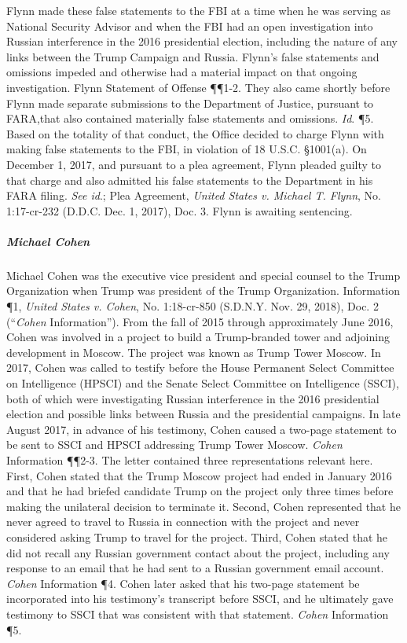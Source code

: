 Flynn made these false statements to the FBI at a time when he was serving as National Security Advisor and when the FBI had an open investigation into Russian interference in the 2016 presidential election, including the nature of any links between the Trump Campaign and Russia.
Flynn's false statements and omissions impeded and otherwise had a material impact on that ongoing investigation.
Flynn Statement of Offense \P\P 1-2.
They also came shortly before Flynn made separate submissions to the Department of Justice, pursuant to FARA,that also contained materially false statements and omissions.
\textit{Id}. \P 5.
Based on the totality of that conduct, the Office decided to charge Flynn with making false statements to the FBI, in violation of 18 U.S.C. \S 1001(a).
On December 1, 2017, and pursuant to a plea agreement, Flynn pleaded guilty to that charge and also admitted his false statements to the Department in his FARA filing.
\textit{See id}.; Plea Agreement, \textit{United States v. Michael T. Flynn}, No. 1:17-cr-232 (D.D.C. Dec. 1, 2017), Doc. 3.
Flynn is awaiting sentencing.

\subparagraph{Michael Cohen}
Michael Cohen was the executive vice president and special counsel to the Trump Organization when Trump was president of the Trump Organization.
Information \P 1, \textit{United States v. Cohen}, No. 1:18-cr-850 (S.D.N.Y. Nov. 29, 2018), Doc. 2 (``\textit{Cohen} Information'').
From the fall of 2015 through approximately June 2016, Cohen was involved in a project to build a Trump-branded tower and adjoining development in Moscow.
The project was known as Trump Tower Moscow.
In 2017, Cohen was called to testify before the House Permanent Select Committee on Intelligence (HPSCI) and the Senate Select Committee on Intelligence (SSCI), both of which were investigating Russian interference in the 2016 presidential election and possible links between Russia and the presidential campaigns.
In late August 2017, in advance of his testimony, Cohen caused a two-page statement to be sent to SSCI and HPSCI addressing Trump Tower Moscow.
\textit{Cohen} Information \P\P 2-3.
The letter contained three representations relevant here.
First, Cohen stated that the Trump Moscow project had ended in January 2016 and that he had briefed candidate Trump on the project only three times before making the unilateral decision to terminate it.
Second, Cohen represented that he never agreed to travel to Russia in connection with the project and never considered asking Trump to travel for the project.
Third, Cohen stated that he did not recall any Russian government contact about the project, including any response to an email that he had sent to a Russian government email account.
\textit{Cohen} Information \P 4.
Cohen later asked that his two-page statement be incorporated into his testimony's transcript before SSCI, and he ultimately gave testimony to SSCI that was consistent with that statement.
\textit{Cohen} Information \P 5.

